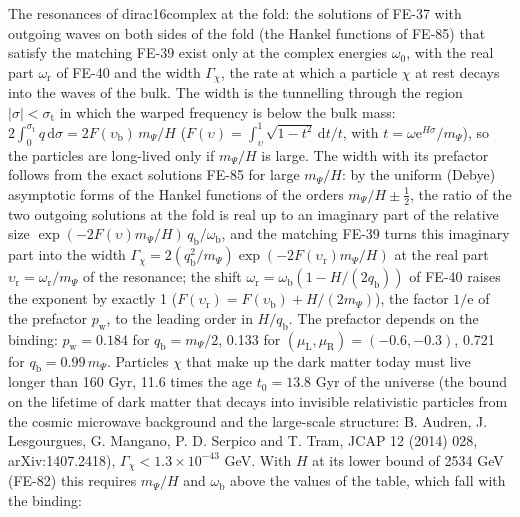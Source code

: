 \documentclass[
  10pt,
]{article}
\begin{document}
The resonances of dirac16complex at the fold: the solutions of FE-37
with outgoing waves on both sides of the fold (the Hankel functions of
FE-85) that satisfy the matching FE-39 exist only at the complex
energies \(\omega_0\), with the real part \(\omega_{\mathrm{r}}\) of
FE-40 and the width \(\Gamma_\chi\), the rate at which a particle
\(\chi\) at rest decays into the waves of the bulk. The width is the
tunnelling through the region
\(\lvert\sigma\rvert < \sigma_{\mathrm{t}}\) in which the warped
frequency is below the bulk mass:
\(2\int_0^{\sigma_{\mathrm{t}}}q\,\mathrm{d}\sigma = 2F(\upsilon_{\mathrm{b}})\,m_\Psi/H\)
(\(F(\upsilon) = \int_{\upsilon}^1\sqrt{1 - t^2}\,\mathrm{d}t/t\), with
\(t = \omega\mathrm{e}^{H\sigma}/m_\Psi\)), so the particles are
long-lived only if \(m_\Psi/H\) is large. The width with its prefactor
follows from the exact solutions FE-85 for large \(m_\Psi/H\): by the
uniform (Debye) asymptotic forms of the Hankel functions of the orders
\(m_\Psi/H \pm \frac12\), the ratio of the two outgoing solutions at the
fold is real up to an imaginary part of the relative size
\(\exp(-2F(\upsilon)m_\Psi/H)\,q_{\mathrm{b}}/\omega_{\mathrm{b}}\), and
the matching FE-39 turns this imaginary part into the width
\(\Gamma_\chi = 2(q_{\mathrm{b}}^2/m_\Psi)\exp(-2F(\upsilon_{\mathrm{r}})m_\Psi/H)\)
at the real part \(\upsilon_{\mathrm{r}} = \omega_{\mathrm{r}}/m_\Psi\)
of the resonance; the shift
\(\omega_{\mathrm{r}} = \omega_{\mathrm{b}}(1 - H/(2q_{\mathrm{b}}))\)
of FE-40 raises the exponent by exactly 1
(\(F(\upsilon_{\mathrm{r}}) = F(\upsilon_{\mathrm{b}}) + H/(2m_\Psi)\)),
the factor \(1/\mathrm{e}\) of the prefactor \(p_{\mathrm{w}}\), to the
leading order in \(H/q_{\mathrm{b}}\). The prefactor depends on the
binding: \(p_{\mathrm{w}} = 0.184\) for \(q_{\mathrm{b}} = m_\Psi/2\),
0.133 for \((\mu_{\mathrm{L}}, \mu_{\mathrm{R}}) = (-0.6, -0.3)\), 0.721
for \(q_{\mathrm{b}} = 0.99\,m_\Psi\). Particles \(\chi\) that make up
the dark matter today must live longer than 160 Gyr, 11.6 times the age
\(t_0 = 13.8\) Gyr of the universe (the bound on the lifetime of dark
matter that decays into invisible relativistic particles from the cosmic
microwave background and the large-scale structure: B. Audren, J.
Lesgourgues, G. Mangano, P. D. Serpico and T. Tram, JCAP 12 (2014) 028,
arXiv:1407.2418), \(\Gamma_\chi < 1.3\times10^{-43}\) GeV. With \(H\) at
its lower bound of 2534 GeV (FE-82) this requires \(m_\Psi/H\) and
\(\omega_{\mathrm{b}}\) above the values of the table, which fall with
the binding:
\end{document}
